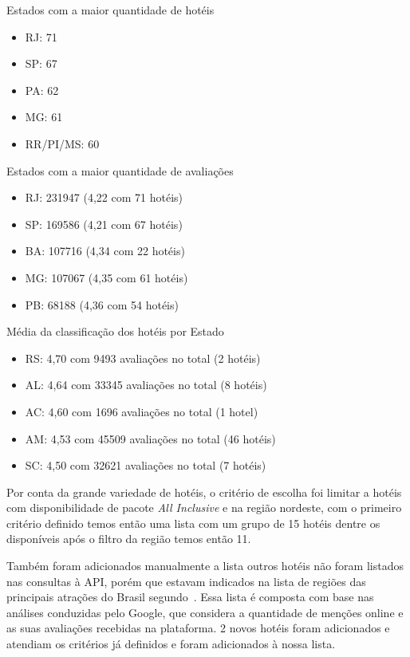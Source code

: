 Estados com a maior quantidade de hotéis
\begin{itemize}
	\item RJ: 71
	\item SP: 67
	\item PA: 62
	\item MG: 61
	\item RR/PI/MS: 60
\end{itemize}

Estados com a maior quantidade de avaliações

\begin{itemize}
	\item RJ: 231947 (4,22 com 71 hotéis)
	\item SP: 169586 (4,21 com 67 hotéis)
	\item BA: 107716 (4,34 com 22 hotéis)
	\item MG: 107067 (4,35 com 61 hotéis)
	\item PB: 68188 (4,36 com 54 hotéis)
\end{itemize}


Média da classificação dos hotéis por Estado

\begin{itemize}
	\item RS: 4,70 com 9493 avaliações no total (2 hotéis)
	\item AL: 4,64 com 33345 avaliações no total (8 hotéis)
	\item AC: 4,60 com 1696 avaliações no total (1 hotel)
	\item AM: 4,53 com 45509 avaliações no total (46 hotéis)
	\item SC: 4,50 com 32621 avaliações no total (7 hotéis)
\end{itemize}

Por conta da grande variedade de hotéis, o critério de escolha foi limitar a hotéis com disponibilidade de pacote \emph{All Inclusive} e na região nordeste, com o primeiro critério definido temos então uma lista com um grupo de 15 hotéis dentre os disponíveis após o filtro da região temos então 11.

Também foram adicionados manualmente a lista outros hotéis não foram listados nas consultas à API, porém que estavam indicados na lista de regiões das principais atrações do Brasil segundo~\cite{googleFlights2022destinos}. Essa lista é composta com base nas análises conduzidas pelo Google, que considera a quantidade de menções online e as suas avaliações recebidas na plataforma. 2 novos hotéis foram adicionados e atendiam os critérios já definidos e foram adicionados à nossa lista.

